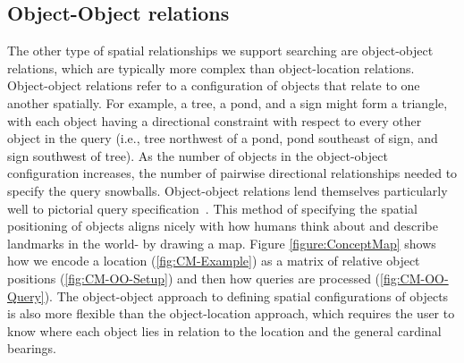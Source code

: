 \subsection{Object-Object relations}

The other type of spatial relationships we support searching are object-object relations, which are typically more complex than object-location relations.
Object-object relations refer to a configuration of objects that relate to one another spatially.
For example, a tree, a pond, and a sign might form a triangle, with each object having a directional constraint with respect to every other object in the query (i.e., tree northwest of a pond, pond southeast of sign, and sign southwest of tree).
As the number of objects in the object-object configuration increases, the number of pairwise directional relationships needed to specify the query snowballs. 
Object-object relations lend themselves particularly well to pictorial query specification~\cite{Soffer1997}.
This method of specifying the spatial positioning of objects aligns nicely with how humans think about and describe landmarks in the world- by drawing a map. 
Figure \ref{figure:ConceptMap} shows how we encode a location (\ref{fig:CM-Example}) as a matrix of relative object positions (\ref{fig:CM-OO-Setup}) and then how queries are processed (\ref{fig:CM-OO-Query}).
The object-object approach to defining spatial configurations of objects is also more flexible than the object-location approach, which requires the user to know where each object lies in relation to the location and the general cardinal bearings. 




